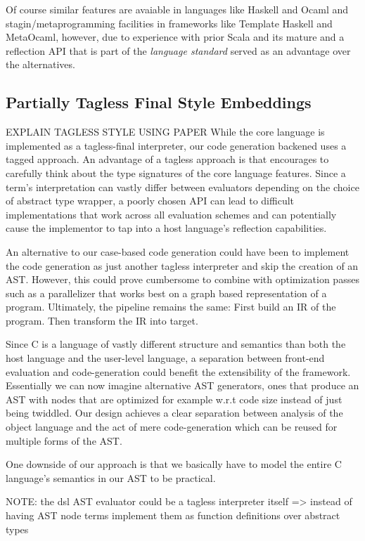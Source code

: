 \documentclass{article}
\begin{document}
Of course similar features are avaiable in languages like Haskell and Ocaml and stagin/metaprogramming facilities in frameworks like Template Haskell and MetaOcaml, however, due to experience with prior Scala and its mature and a reflection API that is part of the \textit{language standard}
served as an advantage over the alternatives.

\subsection{Partially Tagless Final Style Embeddings}\label{subsec:tagless}
EXPLAIN TAGLESS STYLE USING PAPER While the core language is implemented as a tagless-final interpreter, our code generation backened uses a tagged approach. An advantage of a tagless approach is that encourages to carefully think about the type signatures of the core language features. Since a term's interpretation
can vastly differ between evaluators depending on the choice of abstract type wrapper, a poorly chosen API can lead to difficult implementations that work across all evaluation schemes and can potentially cause the implementor to tap into a host language's reflection capabilities.

An alternative to our case-based code generation could have been to implement the code generation as just another tagless interpreter and skip the creation of an AST. However, this could prove cumbersome to combine with optimization passes such as a parallelizer that works best on a graph based representation of a program. Ultimately,
the pipeline remains the same: First build an IR of the program. Then transform the IR into target.

Since C is a language of vastly different structure and semantics than both the host language and the user-level language, a separation between front-end evaluation and code-generation could benefit the extensibility of the framework. Essentially we can now imagine alternative AST generators, ones that produce an AST with nodes that are optimized for example w.r.t code size instead of just being twiddled. Our design achieves
a clear separation between analysis of the object language and the act of mere code-generation which can be reused for multiple forms of the AST.

One downside of our approach is that we basically have to model the entire C language's semantics in our AST to be practical.

NOTE: the dsl AST evaluator could be a tagless interpreter itself => instead of having AST node terms implement them as function definitions over abstract types
\end{document}
